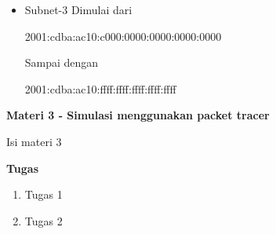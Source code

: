 \documentclass{article}
\begin{document}
\begin{flushleft}
\begin{itemize}
            \item[] Subnet-3 \newline
            Dimulai dari 
            \begin{center}
                2001:cdba:ac10:c000:0000:0000:0000:0000
            \end{center}

            Sampai dengan 
            \begin{center}
                2001:cdba:ac10:ffff:ffff:ffff:ffff:ffff
            \end{center}
        \end{itemize}
    \end{flushleft}

    \newpage
    \begin{flushleft}
        \textbf{Materi 3 - Simulasi menggunakan packet tracer}
        \newline

        Isi materi 3
    \end{flushleft}

    \newpage
    \begin{flushleft}
        \textbf{Tugas}
        \newline

        \begin{enumerate}
            \item Tugas 1
            \item Tugas 2
        \end{enumerate}
    \end{flushleft}
\end{document}

